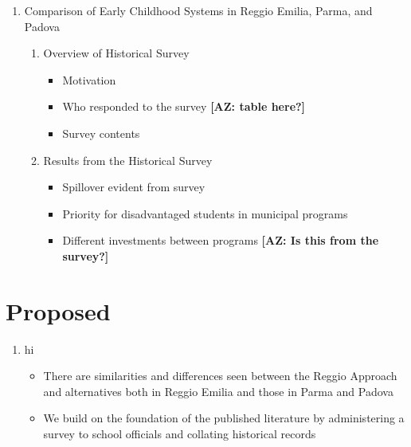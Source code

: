 \documentclass{article}
\begin{document}
\begin{enumerate}
	\item Comparison of Early Childhood Systems in Reggio Emilia, Parma, and Padova
		\begin{enumerate}
		\item Overview of Historical Survey
			\begin{itemize}
			\item Motivation
			\item Who responded to the survey \textbf{[AZ: table here?]}
			\item Survey contents
			\end{itemize}
		\item Results from the Historical Survey
			\begin{itemize}
			\item Spillover evident from survey
			\item Priority for disadvantaged students in municipal programs
			\item Different investments between programs \textbf{[AZ: Is this from the survey?]}
			\end{itemize}
		\end{enumerate}
\end{enumerate}

\section{Proposed}

\begin{enumerate}
\item hi
\begin{itemize}
	\item There are similarities and differences seen between the Reggio Approach and alternatives both in Reggio Emilia and those in Parma and Padova
	\item We build on the foundation of the published literature by administering a survey to school officials and collating historical records
\end{itemize}
\end{enumerate}
\end{document}
